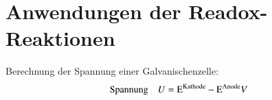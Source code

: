 \section{Anwendungen der Readox-Reaktionen}
Berechnung der Spannung einer Galvanischenzelle:
\begin{align*}
   &\text{Spannung} &&U = \ce{E^{Kathode}} - \ce{E^{Anode}} V\\ 
\end{align*}

